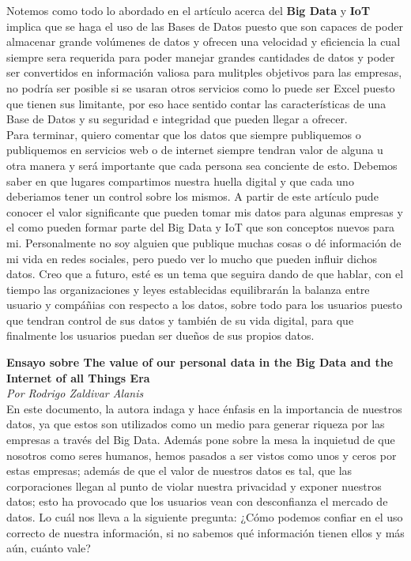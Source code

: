 \documentclass[12pt]{report}
\begin{document}
\begin{enumerate}[label=\textbf{\arabic*.}, leftmargin=*]
\begin{enumerate}[label=\textbf{\alph*.}, leftmargin=*, itemsep=1.0em]
Notemos como todo lo abordado en el artículo acerca del \textbf{Big Data} y \textbf{IoT} implica que se haga el uso de las Bases de Datos puesto que son capaces de poder almacenar grande volúmenes de datos y ofrecen una velocidad y eficiencia la cual siempre sera requerida para poder manejar grandes cantidades de datos y poder ser convertidos en información valiosa para mulitples objetivos para las empresas, no podría ser posible si se usaran otros servicios como lo puede ser Excel puesto que tienen sus limitante, por eso hace sentido contar las características de una Base de Datos y su seguridad e integridad que pueden llegar a ofrecer. \\

Para terminar, quiero comentar que los datos que siempre publiquemos o publiquemos en servicios web o de internet siempre tendran valor de alguna u otra manera y será importante que cada persona sea conciente de esto. Debemos saber en que lugares compartimos nuestra huella digital y que cada uno deberiamos tener un control sobre los mismos. A partir de este artículo pude conocer el valor significante que pueden tomar mis datos para algunas empresas y el como pueden formar parte del Big Data y IoT que son conceptos nuevos para mi. Personalmente no soy alguien que publique muchas cosas o dé información de mi vida en redes sociales, pero puedo ver lo mucho que pueden influir dichos datos. Creo que a futuro, esté es un tema que seguira dando de que hablar, con el tiempo las organizaciones y leyes establecidas equilibrarán la balanza entre usuario y compáñias con respecto a los datos, sobre todo para los usuarios puesto que tendran control de sus datos y también de su vida digital, para que finalmente los usuarios puedan ser dueños de sus propios datos.
\end{enumerate}

\newpage
\textbf{Ensayo sobre The value of our personal data in
the Big Data and the Internet
of all Things Era}\\
\textit{Por Rodrigo Zaldivar Alanis}\\

En este documento, la autora indaga y hace énfasis en la importancia de nuestros datos, ya que estos son utilizados como un medio para generar riqueza por las empresas a través del Big Data. Además pone sobre la mesa la inquietud de que nosotros como seres humanos, hemos pasados a ser vistos como unos y ceros por estas empresas; además de que el valor de nuestros datos es tal, que las corporaciones llegan al punto de violar nuestra privacidad y exponer nuestros datos; esto ha provocado que los usuarios vean con desconfianza el mercado de datos. Lo cuál nos lleva a la siguiente pregunta: ¿Cómo podemos confiar en el uso correcto de nuestra información, si no sabemos qué información tienen ellos y más aún, cuánto vale?\\


\end{enumerate}
\end{document}
